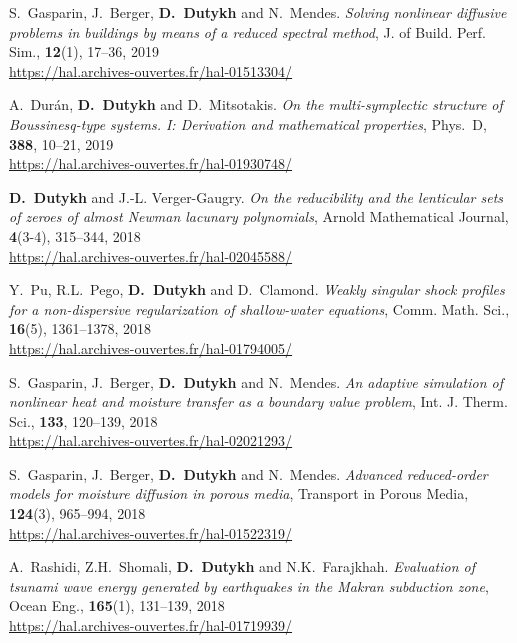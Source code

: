 \begin{etaremune}
  \item S.~Gasparin, J.~Berger, \textbf{D.~Dutykh} and N.~Mendes. \textit{Solving nonlinear diffusive problems in buildings by means of a reduced spectral method}, J. of Build. Perf. Sim., \textbf{12}(1), 17--36, 2019 \\ %
  \url{https://hal.archives-ouvertes.fr/hal-01513304/}
  
  \item A.~Dur\'an, \textbf{D.~Dutykh} and D.~Mitsotakis. \textit{On the multi-symplectic structure of Boussinesq-type systems. I: Derivation and mathematical properties}, Phys.~D, \textbf{388}, 10--21, 2019 \\ %
  \url{https://hal.archives-ouvertes.fr/hal-01930748/}

  
  \item \textbf{D.~Dutykh} and J.-L. Verger-Gaugry. \textit{On the reducibility and the lenticular sets of zeroes of almost Newman lacunary polynomials}, Arnold Mathematical Journal, \textbf{4}(3-4), 315--344, 2018 \\ %
  \url{https://hal.archives-ouvertes.fr/hal-02045588/}
  
  \item Y.~Pu, R.L.~Pego, \textbf{D.~Dutykh} and D.~Clamond. \textit{Weakly singular shock profiles for a non-dispersive regularization of shallow-water equations}, Comm. Math. Sci., \textbf{16}(5), 1361--1378, 2018 \\ %
  \url{https://hal.archives-ouvertes.fr/hal-01794005/}
  
  \item S.~Gasparin, J.~Berger, \textbf{D.~Dutykh} and N.~Mendes. \textit{An adaptive simulation of nonlinear heat and moisture transfer as a boundary value problem}, Int. J. Therm. Sci., \textbf{133}, 120--139, 2018 \\ %
  \url{https://hal.archives-ouvertes.fr/hal-02021293/}

  \item S.~Gasparin, J.~Berger, \textbf{D.~Dutykh} and N.~Mendes. \textit{Advanced reduced-order models for moisture diffusion in porous media}, Transport in Porous Media, \textbf{124}(3), 965--994, 2018 \\ %
  \url{https://hal.archives-ouvertes.fr/hal-01522319/}
  
  \item A.~Rashidi, Z.H.~Shomali, \textbf{D.~Dutykh} and N.K.~Farajkhah. \textit{Evaluation of tsunami wave energy generated by earthquakes in the Makran subduction zone}, Ocean Eng., \textbf{165}(1), 131--139, 2018 \\ %
  \url{https://hal.archives-ouvertes.fr/hal-01719939/}


\end{etaremune}
